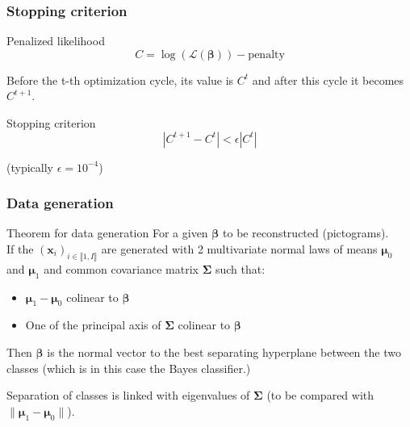 \documentclass{beamer}
\begin{document}
\begin{frame}
    \frametitle{Stopping criterion}
    \begin{block}{Penalized likelihood}
    $$C=  \log(\mathcal{L}(\bm{\beta})) -\text{penalty}$$
    \end{block}
    Before the t-th optimization cycle, its value is $C^{t}$ and after this cycle it becomes $C^{t + 1}$.\\[5 pt]
    \begin{block}{Stopping criterion}
    $$ |C^{t + 1} - C^t| < \epsilon |C^t|$$
    \end{block}
    (typically $\epsilon = 10^{-4}$)
\end{frame}

\begin{frame}
    \frametitle{Data generation}
    \begin{block}{Theorem for data generation}
    For a given $\bm{\beta}$ to be reconstructed (pictograms).\\[5 pt]
    If the $(\mathbf{x}_i)_{i \in \llbracket 1, I\rrbracket}$ are generated with 2 multivariate normal laws of means $\bm{\mu}_0$ and $\bm{\mu}_1$ and common covariance matrix $\bm{\Sigma}$ such that:
    \begin{itemize}
        \item $\bm{\mu}_1 - \bm{\mu}_0$ colinear to $\bm{\beta}$\\[10 pt]
        \item One of the principal axis of $\bm{\Sigma}$ colinear to $\bm{\beta}$
    \end{itemize}
    \vspace{5 pt}
    Then $\bm{\beta}$ is the normal vector to the best separating hyperplane between the two classes (which is in this case the Bayes classifier.)
\end{block}
Separation of classes is linked with eigenvalues of $\bm{\Sigma}$ (to be compared with $\lVert\bm{\mu}_1 - \bm{\mu}_0 \rVert$).
\end{frame}
\end{document}
